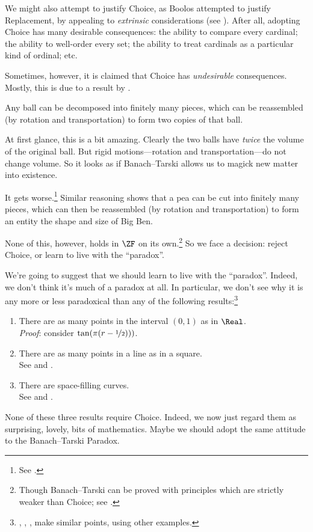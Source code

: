 \documentclass[../../../include/open-logic-section]{subfiles}
\begin{document}

We might also attempt to justify Choice, as Boolos attempted to
justify Replacement, by appealing to \emph{extrinsic} considerations
(see ). After all, adopting Choice
has many desirable consequences: the ability to compare every
cardinal; the ability to well-order every set; the ability to treat
cardinals as a particular kind of ordinal; etc. 

Sometimes, however, it is claimed that Choice has \emph{undesirable}
consequences. Mostly, this is due to a result by
\cite{BanachTarski1924}. 

\begin{thm}
Any ball can be decomposed into finitely many pieces, which can be
reassembled (by rotation and transportation) to form two copies of
that ball.
\end{thm}
\noindent 
At first glance, this is a bit amazing. Clearly the two balls have
\emph{twice} the volume of the original ball. But rigid
motions---rotation and transportation---do not change volume. So it
looks as if Banach--Tarski allows us to magick new matter into
existence.

It gets worse.\footnote{See \cite[Theorem 3.12]{Wagon2016}.} Similar
reasoning shows that a pea can be cut into finitely many pieces, which
can then be reassembled (by rotation and transportation) to form an
entity the shape and size of Big Ben.

None of this, however, holds in $\ZF$ on its own.\footnote{Though
Banach--Tarski can be proved with principles which are strictly weaker
than Choice; see \cite[303]{Wagon2016}.} So we face a decision:
reject Choice, or learn to live with the ``paradox''. 

We're going to suggest that we should learn to live with the
``paradox''. Indeed, we don't think it's much of a paradox at all. In
particular, we don't see why it is any more or less paradoxical than
any of the following results:\footnote{\cite[276--7]{Potter2004},
\cite[16]{Weston2003}, \cite[31, 308--9]{Wagon2016}, make
similar points, using other examples.}
\begin{enumerate}
	\item There are as many points in the interval $(0,1)$ as in  $\Real$. 
	\\\emph{Proof}: consider $\tan(\pi(r-\nicefrac{1}{2})))$.
	\item There are as many points in a line as in a square.
	\\See {} and .
	\item There are space-filling curves. 
	\\See {} and .
\end{enumerate}
None of these three results require Choice. Indeed, we now just regard
them as surprising, lovely, bits of mathematics. Maybe we should adopt
the same attitude to the Banach--Tarski Paradox.
\end{document}

